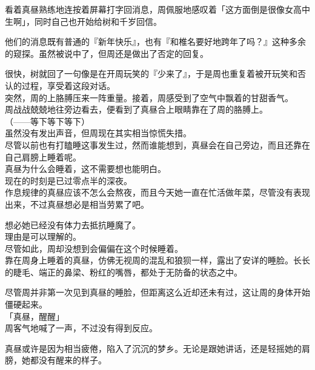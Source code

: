 看着真昼熟练地连按着屏幕打字回消息，周佩服地感叹着「这方面倒是很像女高中生啊」，同时自己也开始给树和千岁回信。

他们的消息既有普通的『新年快乐』，也有『和椎名要好地跨年了吗？』这种多余的窥探。虽然被说中了，但周还是做出了否定的回复。

很快，树就回了一句像是在开周玩笑的『少来了』，于是周也重复着被开玩笑和否认的过程，享受着这段对话。\\

突然，周的上胳膊压来一阵重量。接着，周感受到了空气中飘着的甘甜香气。\\

周战战兢兢地往旁边看去，便看到了真昼合上眼睛靠在了周的胳膊上。\\

（——等下等下等下）\\

虽然没有发出声音，但周现在其实相当惊慌失措。\\

尽管以前也有打瞌睡这事发生过，然而谁能想到，真昼会在自己旁边，而且还靠在自己肩膀上睡着呢。\\

真昼为什么会睡着，这不需要想也能明白。\\

现在的时刻是已过零点半的深夜。\\

作息规律的真昼应该不怎么会熬夜，而且今天她一直在忙活做年菜，尽管没有表现出来，不过真昼想必是相当劳累了吧。

想必她已经没有体力去抵抗睡魔了。\\

理由是可以理解的。\\

尽管如此，周却没想到会偏偏在这个时候睡着。\\

靠在周身上睡着的真昼，仿佛无视周的混乱和狼狈一样，露出了安详的睡脸。长长的睫毛、端正的鼻梁、粉红的嘴唇，都处于无防备的状态之中。

尽管周并非第一次见到真昼的睡脸，但距离这么近却还未有过，这让周的身体开始僵硬起来。\\

「真昼，醒醒」\\

周客气地喊了一声，不过没有得到反应。

真昼或许是因为相当疲倦，陷入了沉沉的梦乡。无论是跟她讲话，还是轻摇她的肩膀，她都没有醒来的样子。\\

